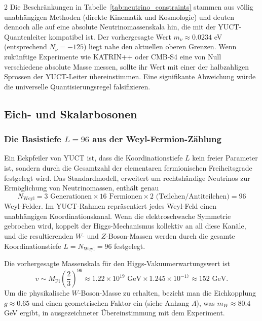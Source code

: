\documentclass[11pt,a4paper]{article}
\begin{document}
\begin{multicols}{2}
		Die Beschränkungen in Tabelle~\ref{tab:neutrino_constraints} stammen aus völlig unabhängigen Methoden (direkte Kinematik und Kosmologie) und deuten dennoch alle auf eine absolute Neutrinomassenskala hin, die mit der YUCT-Quantenleiter kompatibel ist. Der vorhergesagte Wert $m_\nu \approx 0.0234$ eV (entsprechend $N_\nu = -125$) liegt nahe den aktuellen oberen Grenzen. Wenn zukünftige Experimente wie KATRIN++ oder CMB-S4 eine von Null verschiedene absolute Masse messen, sollte ihr Wert mit einer der halbzahligen Sprossen der YUCT-Leiter übereinstimmen. Eine signifikante Abweichung würde die universelle Quantisierungsregel falsifizieren.
		
		\subsection{Eich- und Skalarbosonen}
		
		\subsubsection{Die Basistiefe $L=96$ aus der Weyl-Fermion-Zählung}
		
		Ein Eckpfeiler von YUCT ist, dass die Koordinationstiefe $L$ kein freier Parameter ist, sondern durch die Gesamtzahl der elementaren fermionischen Freiheitsgrade festgelegt wird. Das Standardmodell, erweitert um rechtshändige Neutrinos zur Ermöglichung von Neutrinomassen, enthält genau
		\scriptsize
		\[
		N_{\text{Weyl}} = 3 \text{ Generationen} \times 16 \text{ Fermionen} \times 2 \text{ (Teilchen/Antiteilchen)} = 96
		\]
		\small
		Weyl-Felder. Im YUCT-Rahmen repräsentiert jedes Weyl-Feld einen unabhängigen Koordinationskanal. Wenn die elektroschwache Symmetrie gebrochen wird, koppelt der Higgs-Mechanismus kollektiv an all diese Kanäle, und die resultierenden $W$- und $Z$-Boson-Massen werden durch die gesamte Koordinationstiefe $L = N_{\text{Weyl}} = 96$ festgelegt.
		
		Die vorhergesagte Massenskala für den Higgs-Vakuumerwartungswert ist
		\begin{equation}
			v \sim M_{\mathrm{Pl}} \left( \frac{2}{3} \right)^{96} \approx 1.22 \times 10^{19} \text{ GeV} \times 1.245\times10^{-17} \approx 152 \text{ GeV}.
		\end{equation}
		Um die physikalische $W$-Boson-Masse zu erhalten, bezieht man die Eichkopplung $g \approx 0.65$ und einen geometrischen Faktor ein (siehe Anhang $\Lambda$), was $m_W \approx 80.4$ GeV ergibt, in ausgezeichneter Übereinstimmung mit dem Experiment.
		

\end{multicols}
\end{document}
